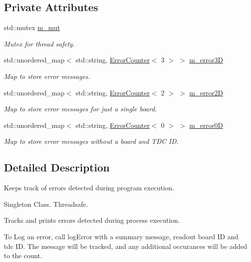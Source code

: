 \subsection*{Private Attributes}
\begin{DoxyCompactItemize}
\item 
std\+::mutex \hyperlink{class_error_spy_ae7d03be7562c1eb3ed4de48e33d89070}{m\+\_\+mut}
\begin{DoxyCompactList}\small\item\em Mutex for thread safety. \end{DoxyCompactList}\item 
std\+::unordered\+\_\+map$<$ std\+::string, \hyperlink{class_error_counter}{Error\+Counter}$<$ 3 $>$ $>$ \hyperlink{class_error_spy_af7de57cb54056410117531acd071ee38}{m\+\_\+error3D}
\begin{DoxyCompactList}\small\item\em Map to store error messages. \end{DoxyCompactList}\item 
std\+::unordered\+\_\+map$<$ std\+::string, \hyperlink{class_error_counter}{Error\+Counter}$<$ 2 $>$ $>$ \hyperlink{class_error_spy_a666798820a5fc5a4e35f6e325a59053e}{m\+\_\+error2D}
\begin{DoxyCompactList}\small\item\em Map to store error messages for just a single board. \end{DoxyCompactList}\item 
std\+::unordered\+\_\+map$<$ std\+::string, \hyperlink{class_error_counter}{Error\+Counter}$<$ 0 $>$ $>$ \hyperlink{class_error_spy_a79ef6f818633163c9d553e681a0244dd}{m\+\_\+error0D}
\begin{DoxyCompactList}\small\item\em Map to store error messages without a board and T\+DC ID. \end{DoxyCompactList}\end{DoxyCompactItemize}


\subsection{Detailed Description}
Keeps track of errors detected during program execution. 

Singleton Class. Threadsafe.

Tracks and prints errors detected during process execution.

To Log an error, call log\+Error with a summary message, readout board ID and tdc ID. The message will be tracked, and any additional occurances will be added to the count. 

